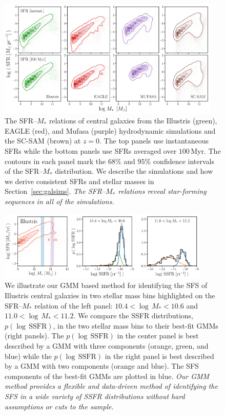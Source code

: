 \documentclass[tighten, preprint]{aastex62}
\begin{document}
\begin{figure}
\begin{center}
\includegraphics[width=0.95\textwidth]{Sims_SFR_Mstar.pdf} 
\caption{The SFR--$M_*$ relations of central galaxies from 
the Illustris (green), EAGLE (red), and {\sc Mufasa} (purple) hydrodynamic 
simulations and the SC-SAM (brown) at $z=0$. The top panels use instantaneous 
SFRs while the bottom panels use SFRs averaged over $100\,\mathrm{Myr}$. The 
contours in each panel mark the $68\%$ and $95\%$ confidence intervals of the 
SFR--$M_*$ distribution. We describe the simulations and how we derive consistent 
SFRs and stellar masses in Section~\ref{sec:galsims}. \emph{The SFR--$M_*$ relations 
reveal star-forming sequences in all of the simulations.}} 
\label{fig:sfrmstar}
\end{center}
\end{figure}
\begin{figure}
\begin{center}
\includegraphics[width = 0.9\textwidth]{SFMSfit_demo.pdf} 
\caption{
We illustrate our 
{GMM based method for identifying the SFS of} Illustris central galaxies in two 
stellar mass bins highlighted on the SFR--$M_*$ relation of the left panel: 
$10.4 < \log\,M_* < 10.6$ and $11.0 < \log\,M_* < 11.2$. We compare the SSFR 
distributions, $p(\log\,\mathrm{SSFR})$, in the two stellar mass bins to their 
best-fit GMMs (right panels). The $p(\log\,\mathrm{SSFR})$ in the center panel is best described by a 
GMM with three components (orange, green, and blue) while the
$p(\log\,\mathrm{SSFR})$ in the right panel is best described by 
a GMM with two components (orange and blue). The SFS components of the 
best-fit GMMs are plotted in blue. \emph{Our GMM method provides
a flexible and data-driven method of identifying the SFS in a wide variety 
of SSFR distributions without hard assumptions or cuts to the sample.}
}\label{fig:fitdemo}
\end{center}
\end{figure}
\end{document}
